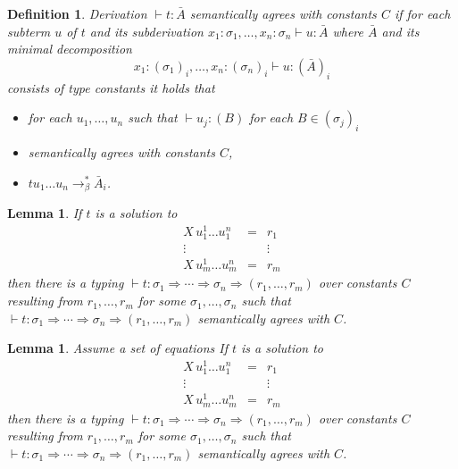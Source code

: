 \documentclass[10pt,a4paper]{article}
\theoremstyle{plain}%
\newtheorem{definition}[theorem]{Definition}
\newtheorem{lemma}[theorem]{Lemma}
\begin{document}
\begin{definition}
  Derivation $\vdash t : \bar{A}$ \emph{semantically agrees with constants
    $C$} if for each subterm $u$ of $t$ and its subderivation
  $x_1:\sigma_1,\ldots,x_n:\sigma_n\vdash u : \bar{A}$ where $\bar{A}$
  and its minimal decomposition
  \begin{displaymath}
    x_1:(\sigma_1)_i,\ldots,x_n:(\sigma_n)_i\vdash u : (\bar{A})_i
  \end{displaymath}
  consists of type constants it holds that
  \begin{itemize}
  \item for each $u_1,\ldots,u_n$ such that $\vdash u_j:(B)$ for each $B\in(\sigma_j)_i$ 
  \item semantically agrees with constants $C$,
  \item $tu_1\ldots u_n\to_\beta^* \bar{A}_i$.
  \end{itemize}
\end{definition}


\begin{lemma}
  If $t$ is a solution to
  \[
    \begin{array}{lll}
      X\,u_1^1\ldots u_1^n &=& r_1\\
      \vdots&&\vdots\\
      X\,u_m^1\ldots u_m^n &=& r_m
    \end{array}
  \]
  then there is a typing
  $\vdash t :\sigma_1\Rightarrow\cdots\Rightarrow\sigma_n\Rightarrow(r_1,\ldots,r_m)$
  over constants $C$ resulting from $r_1,\ldots,r_m$ for some $\sigma_1,\ldots,\sigma_n$ such that
  $\vdash t :\sigma_1\Rightarrow\cdots\Rightarrow\sigma_n\Rightarrow(r_1,\ldots,r_m)$  semantically agrees with $C$.
\end{lemma}

\begin{lemma}
  Assume a set of equations
  If $t$ is a solution to
  \[
    \begin{array}{lll}
      X\,u_1^1\ldots u_1^n &=& r_1\\
      \vdots&&\vdots\\
      X\,u_m^1\ldots u_m^n &=& r_m
    \end{array}
  \]
  then there is a typing
  $\vdash t :\sigma_1\Rightarrow\cdots\Rightarrow\sigma_n\Rightarrow(r_1,\ldots,r_m)$
  over constants $C$ resulting from $r_1,\ldots,r_m$ for some $\sigma_1,\ldots,\sigma_n$ such that
  $\vdash t :\sigma_1\Rightarrow\cdots\Rightarrow\sigma_n\Rightarrow(r_1,\ldots,r_m)$  semantically agrees with $C$.
\end{lemma}
\end{document}
